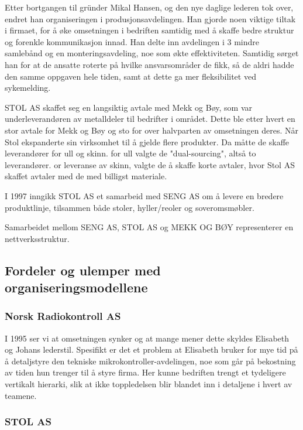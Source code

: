 Etter bortgangen til gründer Mikal Hansen, og den nye daglige lederen tok over, endret han organiseringen i produsjonsavdelingen.
Han gjorde noen viktige tiltak i firmaet, for å øke omsetningen i bedriften samtidig med å skaffe bedre struktur og forenkle kommunikasjon innad.
Han delte inn avdelingen i 3 mindre samlebånd og en monteringsavdeling, noe som økte effektiviteten. Samtidig sørget han for at de ansatte roterte på hvilke ansvarsområder de fikk, så de aldri hadde den samme oppgaven hele tiden, samt at dette ga mer fleksibilitet ved sykemelding.

STOL AS skaffet seg en langsiktig avtale med Mekk og Bøy, som var underleverandøren av metalldeler til bedrifter i området. Dette ble etter hvert en stor avtale for Mekk og Bøy og sto for over halvparten av omsetningen deres. Når Stol ekspanderte sin virksomhet til å gjelde flere produkter. Da måtte de skaffe leverandører for ull og skinn. for ull valgte de "dual-sourcing", altså to leverandører. or leveranse av skinn, valgte de å skaffe korte avtaler, hvor Stol AS skaffet avtaler med de med billigst materiale.

I 1997 inngikk STOL AS et samarbeid med SENG AS om å levere en bredere produktlinje, tilsammen både stoler, hyller/reoler og soveromsmøbler.

Samarbeidet mellom SENG AS, STOL AS og MEKK OG BØY representerer en nettverksstruktur.

\subsection{Fordeler og ulemper med organiseringsmodellene}

\subsubsection{Norsk Radiokontroll AS}

I 1995 ser vi at omsetningen synker og at mange mener dette skyldes Elisabeth og Johans lederstil. Spesifikt er det et problem at Elisabeth bruker for mye tid på å detaljstyre den tekniske mikrokontroller-avdelingen, noe som går på bekostning av tiden hun trenger til å styre firma.
Her kunne bedriften trengt et tydeligere vertikalt hierarki, slik at ikke toppledelsen blir blandet inn i detaljene i hvert av teamene.

\subsubsection{STOL AS}

